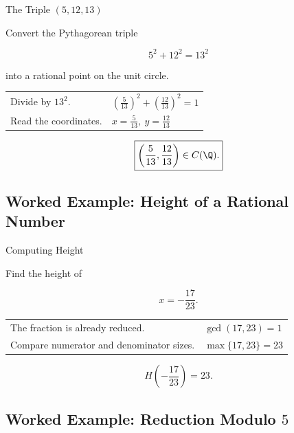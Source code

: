\begin{workedexamplebox}{The Triple \((5,12,13)\)}

Convert the Pythagorean triple

\[ 5^2+12^2=13^2 \]

into a rational point on the unit circle.

\begin{tabularx}{\textwidth}{@{}>{\raggedright\arraybackslash}p{}X@{}}
Divide by \(13^2\). &
\(\left(\frac5{13}\right)^2+\left(\frac{12}{13}\right)^2=1\)\\
Read the coordinates. &
\(x=\frac5{13},\ y=\frac{12}{13}\)
\end{tabularx}

\begin{answerbox}
\[ \boxed{\left(\frac5{13},\frac{12}{13}\right)\in C(\Q).} \]
\end{answerbox}
\end{workedexamplebox}

\subsection{Worked Example: Height of a Rational Number}
\label{subsec:worked-rational-height}

\begin{workedexamplebox}{Computing Height}

Find the height of

\[ x=-\frac{17}{23}. \]

\begin{tabularx}{\textwidth}{@{}>{\raggedright\arraybackslash}p{}X@{}}
The fraction is already reduced. & \(\gcd(17,23)=1\)\\
Compare numerator and denominator sizes. & \(\max\{17,23\}=23\)
\end{tabularx}

\begin{answerbox}
\[ \boxed{H\left(-\frac{17}{23}\right)=23.} \]
\end{answerbox}
\end{workedexamplebox}

\subsection{Worked Example: Reduction Modulo \(5\)}
\label{subsec:worked-curve-reduction}

